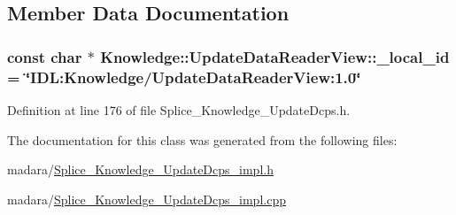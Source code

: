 \subsection{Member Data Documentation}
\hypertarget{classKnowledge_1_1UpdateDataReaderView_a245b395880e8012c3522f482ce57714d}{
\subsubsection[{\_\-local\_\-id}]{\setlength{\rightskip}{0pt plus 5cm}const char $\ast$ {\bf Knowledge::UpdateDataReaderView::\_\-local\_\-id} = \char`\"{}IDL:Knowledge/UpdateDataReaderView:1.0\char`\"{}}}
\label{dc/d54/classKnowledge_1_1UpdateDataReaderView_a245b395880e8012c3522f482ce57714d}


Definition at line 176 of file Splice\_\-Knowledge\_\-UpdateDcps.h.



The documentation for this class was generated from the following files:\begin{DoxyCompactItemize}
\item 
madara/\hyperlink{Splice__Knowledge__UpdateDcps__impl_8h}{Splice\_\-Knowledge\_\-UpdateDcps\_\-impl.h}\item 
madara/\hyperlink{Splice__Knowledge__UpdateDcps__impl_8cpp}{Splice\_\-Knowledge\_\-UpdateDcps\_\-impl.cpp}\end{DoxyCompactItemize}
